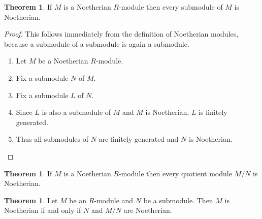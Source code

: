 \documentclass[a4paper]{book}
\theoremstyle{definition}
\newtheorem{theorem}[definition]{Theorem}
\begin{document}
\begin{thmbox}
    \begin{theorem}
        If \(M\) is a Noetherian \(R\)-module then every submodule of \(M\) is Noetherian.
    \end{theorem}
\end{thmbox}
\begin{proof}
    This follows immediately from the definition of Noetherian modules, because a submodule of a submodule is again a submodule.
    \begin{enumerate}
        \item Let \(M\) be a Noetherian \(R\)-module.
        \item Fix a submodule \(N\) of \(M\).
        \item Fix a submodule \(L\) of \(N\).
        \item Since \(L\) is also a submodule of \(M\) and \(M\) is Noetherian, \(L\) is finitely generated.
        \item Thus all submodules of \(N\) are finitely generated and \(N\) is Noetherian.
    \end{enumerate}
\end{proof}
\begin{thmbox}
    \begin{theorem}
        If \(M\) is a Noetherian \(R\)-module then every quotient module \(M / N\) is Noetherian.
    \end{theorem}
\end{thmbox}
\begin{thmbox}
    \begin{theorem}
        Let \(M\) be an \(R\)-module and \(N\) be a submodule. Then \(M\) is Noetherian if and only if \(N\) and \(M / N\) are Noetherian.
    \end{theorem}
\end{thmbox}
\end{document}

